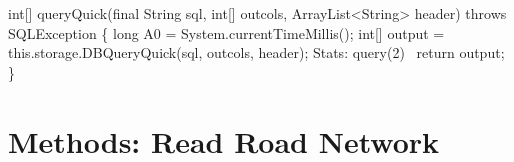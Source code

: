 int[] queryQuick(final String sql, int[] outcols, ArrayList<String> header) throws SQLException \{
  long A0 = System.currentTimeMillis();
  int[] output = this.storage.DBQueryQuick(sql, outcols, header);
  \LA{}Stats: query(2)~{\nwtagstyle{}}\RA{}
  return output;
\}
\eatline
{}\nwendcode{}\nwdocspar
\section{Methods: Read Road Network}

